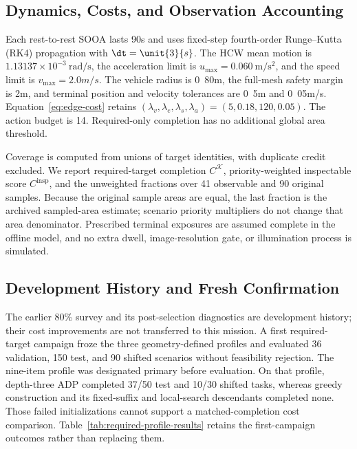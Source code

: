 \subsection{Dynamics, Costs, and Observation Accounting}

Each rest-to-rest SOOA lasts \unit{90}{s} and uses fixed-step fourth-order Runge--Kutta (RK4) propagation with $\dt=\unit{3}{s}$. The HCW mean motion is $1.13137\times10^{-3}~\mathrm{rad/s}$, the acceleration limit is $u_{\max}=0.060~\mathrm{m/s^2}$, and the speed limit is $v_{\max}=\unit{2.0}{m/s}$. The vehicle radius is \unit{0.80}{m}, the full-mesh safety margin is \unit{2}{m}, and terminal position and velocity tolerances are \unit{0.5}{m} and \unit{0.05}{m/s}. Equation~\eqref{eq:edge-cost} retains $(\lambda_v,\lambda_e,\lambda_s,\lambda_a)=(5,0.18,120,0.05)$. The action budget is 14. Required-only completion has no additional global area threshold.

Coverage is computed from unions of target identities, with duplicate credit excluded. We report required-target completion $C^{\mathcal K}$, priority-weighted inspectable score $C^{\mathrm{insp}}$, and the unweighted fractions over 41 observable and 90 original samples. Because the original sample areas are equal, the last fraction is the archived sampled-area estimate; scenario priority multipliers do not change that area denominator. Prescribed terminal exposures are assumed complete in the offline model, and no extra dwell, image-resolution gate, or illumination process is simulated.

\subsection{Development History and Fresh Confirmation}

The earlier 80\% survey and its post-selection diagnostics are development history; their cost improvements are not transferred to this mission. A first required-target campaign froze the three geometry-defined profiles and evaluated 36 validation, 150 test, and 90 shifted scenarios without feasibility rejection. The nine-item profile was designated primary before evaluation. On that profile, depth-three ADP completed 37/50 test and 10/30 shifted tasks, whereas greedy construction and its fixed-suffix and local-search descendants completed none. Those failed initializations cannot support a matched-completion cost comparison. Table~\ref{tab:required-profile-results} retains the first-campaign outcomes rather than replacing them.

